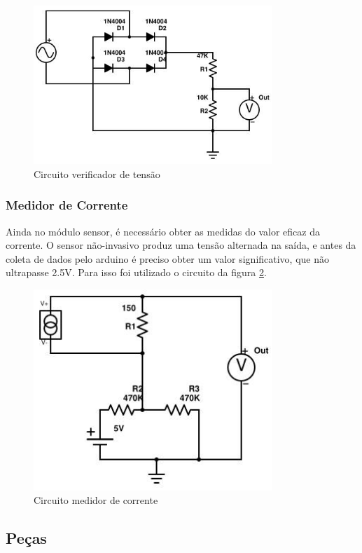 \begin{figure}[H]
\centering
\includegraphics[width=9cm,keepaspectratio]{figuras/voltage-circuit.jpg}
\caption{\label{fig:voltage-circuit} Circuito verificador de tensão}
\end{figure}

\subsubsection{Medidor de Corrente}

Ainda no módulo sensor, é necessário obter as medidas do valor eficaz da corrente. O sensor não-invasivo produz uma tensão alternada na saída, e antes da coleta de dados pelo arduino é preciso obter um valor significativo, que não ultrapasse 2.5V. Para isso foi utilizado o circuito da figura \ref{fig:sensor-circuit}.

\begin{figure}[H]
\centering
\includegraphics[width=9cm,keepaspectratio]{figuras/current-circuit.jpg}
\caption{\label{fig:sensor-circuit} Circuito medidor de corrente}
\end{figure}
%
\subsection{Peças}
